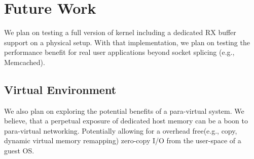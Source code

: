
\section{Future Work}
We plan on testing a full version of \oursys kernel including a dedicated RX buffer support on a physical setup. With that implementation, we plan on testing the performance benefit for real user applications beyond socket splicing (e.g., Memcached).

\subsection{Virtual Environment}

We also plan on exploring the potential benefits of \oursys a para-virtual system. We believe, that a perpetual exposure of dedicated host memory can be a boon to para-virtual networking. Potentially allowing for a overhead free(e.g., copy, dynamic virtual memory remapping) zero-copy I/O from the user-space of a guest OS. 



